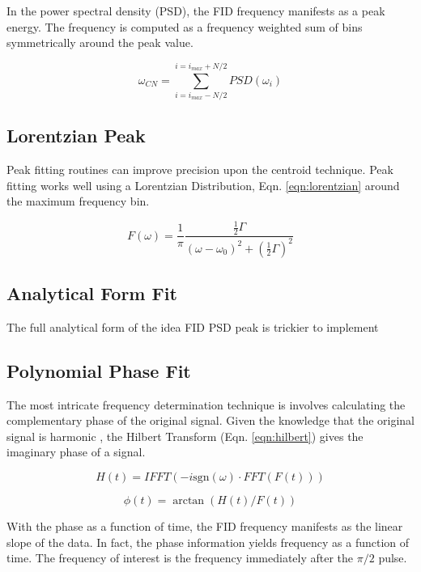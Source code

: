 In the power spectral density (PSD), the FID frequency manifests as a peak energy.  The frequency is computed as a frequency weighted  sum of bins symmetrically around the peak value.

\begin{equation}
\omega_{CN} = \sum_{i=i_{max} - N/2}^{i=i_{max} + N/2} PSD(\omega_i)
\label{eqn:freq-cn}
\end{equation}


\subsection{Lorentzian Peak}
Peak fitting routines can improve precision upon the centroid technique.  Peak fitting works well using a Lorentzian Distribution, Eqn. \ref{eqn:lorentzian} around the maximum frequency bin.

\begin{equation}
F(\omega) = \frac{1}{\pi}\frac{\frac{1}{2} \Gamma}{(\omega - \omega_0)^2 + (\frac{1}{2} \Gamma)^2}
\label{eqn:lorentzian}
\end{equation}

\subsection{Analytical Form Fit}
The full analytical form of the idea FID PSD peak is trickier to implement


\subsection{Polynomial Phase Fit}
The most intricate frequency determination technique is involves calculating the complementary phase of the original signal.  Given the knowledge that the original signal is harmonic , the Hilbert Transform (Eqn. \ref{eqn:hilbert}) gives the imaginary phase of a signal.

\begin{equation}
H(t) = IFFT(-i \mathrm{sgn}(\omega) \cdot FFT(F(t)))
\label{eqn:hilbert}
\end{equation}

\begin{equation}
\phi(t) = \arctan(H(t) / F(t))
\label{eqn:phase}
\end{equation}

With the phase as a function of time, the FID frequency manifests as the linear slope of the data.  In fact, the phase information yields frequency as a function of time.  The frequency of interest is the frequency immediately after the $\pi/2$ pulse.

